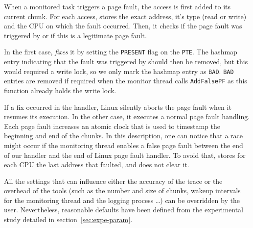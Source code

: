 When a monitored task triggers a page fault, the access is first added
to its current chunk. For each access, \Moca stores the exact address, it's type (read
or write) and the CPU on which the fault occurred.  Then, it checks if the page
fault was triggered by \Moca or if this is a legitimate page fault.

In the first
case, \Moca \emph{fixes} it by setting the \texttt{PRESENT} flag on the \texttt{PTE}.
The hashmap entry indicating that the fault was triggered by \Moca should then
be removed, but this would required a write lock, so we only mark the hashmap
entry as \texttt{BAD}. \texttt{BAD} entries are removed if required when the
monitor thread calls \texttt{AddFalsePF} as this function already holds the
write lock.

If a fix occurred in the \Moca handler, Linux silently aborts the page fault
when it resumes its execution. In the other case, it executes a normal page fault handling. Each page
fault increases an atomic clock that is used to timestamp the beginning and end
of the chunks.
In this description, one can notice that a race might occur if the monitoring thread enables a false page fault between the
end of our handler and the end of Linux page fault handler. To avoid that, \Moca stores
for each CPU the last address that faulted, and does not clear it.

All the settings that can influence either the accuracy of the trace or the
overhead of the tools (such as the number and size of chunks, wakeup intervals
for the monitoring thread and the logging process \ldots) can be overridden by the
user. Nevertheless, reasonable defaults have been defined from the experimental study
detailed in section~\ref{sec:expe-param}.
